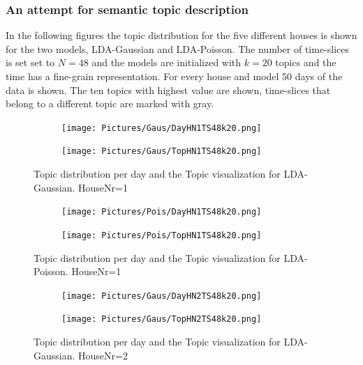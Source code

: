\documentclass[11pt,a4paper]{article}
\begin{document}
\subsubsection{An attempt for semantic topic description}
In the following figures the topic distribution for the five different houses is shown for the two models, LDA-Gaussian and LDA-Poisson. The number of time-slices is set set to $N=48$ and the models are initialized with $k=20$ topics and the time has a fine-grain representation. For every house and model 50 days of the data is shown. The ten topics with highest value are shown, time-slices that belong to a different topic are marked with gray.
\begin{figure}
 \centering
 \begin{subfigure}[b]{0.45\linewidth}
  \centering
  \texttt{[image: Pictures/Gaus/DayHN1TS48k20.png]}
 \end{subfigure}
 \begin{subfigure}[b]{0.45\linewidth}
  \centering
  \texttt{[image: Pictures/Gaus/TopHN1TS48k20.png]}
 \end{subfigure}
 \caption{Topic distribution per day and the Topic visualization for LDA-Gaussian. HouseNr=1}
\end{figure}

\begin{figure}
 \centering
 \begin{subfigure}[b]{0.45\linewidth}
  \centering
  \texttt{[image: Pictures/Pois/DayHN1TS48k20.png]}
 \end{subfigure}
 \begin{subfigure}[b]{0.45\linewidth}
  \centering
  \texttt{[image: Pictures/Pois/TopHN1TS48k20.png]}
 \end{subfigure}
 \caption{Topic distribution per day and the Topic visualization for LDA-Poisson. HouseNr=1}
\end{figure}
\begin{figure}
 \centering
 \begin{subfigure}[b]{0.45\linewidth}
  \centering
  \texttt{[image: Pictures/Gaus/DayHN2TS48k20.png]}
 \end{subfigure}
 \begin{subfigure}[b]{0.45\linewidth}
  \centering
  \texttt{[image: Pictures/Gaus/TopHN2TS48k20.png]}
 \end{subfigure}
 \caption{Topic distribution per day and the Topic visualization for LDA-Gaussian. HouseNr=2}
\end{figure}
\end{document}
